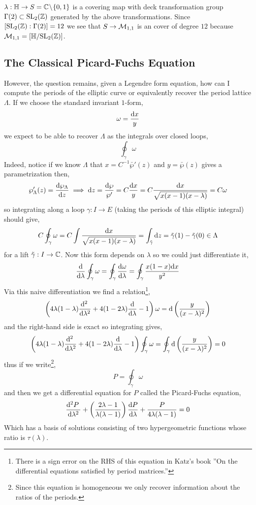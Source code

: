 \documentclass[12pt]{article}
\begin{document}
\begin{rmk}
$\lambda : \mathbb{H} \to S = \mathbb{C} \! \setminus \! \{ 0, 1 \}$ is a covering map with deck transformation group $\Gamma(2) \subset \mathrm{SL}_2(\mathbb{Z})$ generated by the above transformations. Since $[ \mathrm{SL}_2(\mathbb{Z}) : \Gamma(2)] = 12$ we see that $S \to \mathcal{M}_{1,1}$ is an \etale cover of degree $12$ because $\mathcal{M}_{1,1} = [\mathbb{H} / \mathrm{SL}_2(\mathbb{Z})]$.  
\end{rmk}


\subsection{The Classical Picard-Fuchs Equation}

However, the question remains, given a Legendre form equation, how can I compute the periods of the elliptic curve or equivalently recover the period lattice $\Lambda$. If we choose the standard invariant $1$-form,
\[ \omega = \frac{\mathrm{d}{x}}{y} \]
we expect to be able to recover $\Lambda$ as the integrals over closed loops,
\[ \oint_\gamma \omega \]
Indeed, notice if we know $\Lambda$ that $x = C^{-1} \bar{\wp}'(z)$ and $y = \bar{\wp}(z)$ gives a parametrization then,
\[ \wp'_{\Lambda}(z) = \frac{\mathrm{d}{\wp_\Lambda}}{\mathrm{d}{z}} \implies \mathrm{d}{z} = \frac{\mathrm{d}{\wp}}{\wp'} = C \frac{\mathrm{d}{x}}{y} = C \frac{\mathrm{d}{x}}{\sqrt{x(x-1)(x-\lambda)}} = C \omega \]
so integrating along a loop $\gamma : I \to E$ (taking the periods of this elliptic integral) should give,
\[ C \oint_\gamma \omega = C \int \frac{\mathrm{d}{x}}{\sqrt{x(x-1)(x-\lambda)}} = \int_{\tilde{\gamma}} \mathrm{d}{z} = \tilde{\gamma}(1) - \tilde{\gamma}(0) \in \Lambda \]
for a lift $\tilde{\gamma} : I \to \mathbb{C}$. Now this form depends on $\lambda$ so we could just differentiate it,
\[ \frac{\mathrm{d}{}}{\mathrm{d}{\lambda}} \oint_\gamma \omega = \oint_\gamma \frac{\mathrm{d}{\omega}}{\mathrm{d}{\lambda}} = \oint_{\gamma} \frac{x(1-x) \mathrm{d}{x}}{y^2} \]
Via this naive differentiation we find a relation\footnote{There is a sign error on the RHS of this equation in Katz's book ''On the differential equations satisfied by period matrices.''},
\[ \left( 4 \lambda(1 - \lambda) \frac{\mathrm{d}^{2}  \:}{\mathrm{d}{\lambda}^{2}} + 4 (1 - 2 \lambda) \frac{\mathrm{d}{}}{\mathrm{d}{\lambda}} - 1 \right) \omega = \mathrm{d} \left( \frac{y}{(x - \lambda)^2} \right) \]
and the right-hand side is exact so integrating gives,
\[ \left( 4 \lambda(1 - \lambda) \frac{\mathrm{d}^{2}  \:}{\mathrm{d}{\lambda}^{2}} + 4 (1 - 2 \lambda) \frac{\mathrm{d}{}}{\mathrm{d}{\lambda}} - 1 \right) \oint_\gamma  \omega = \oint_\gamma \mathrm{d} \left( \frac{y}{(x - \lambda)^2} \right) = 0 \] 
thus if we write\footnote{Since this equation is homogeneous we only recover information about the ratios of the periods.},
\[ P = \oint_\gamma \omega \]
and then we get a differential equation for $P$ called the Picard-Fuchs equation,
\[ \frac{\mathrm{d}^{2} P \:}{\mathrm{d}{\lambda}^{2}} + \left( \frac{2 \lambda - 1}{\lambda (\lambda - 1)} \right) \frac{\mathrm{d}{P}}{\mathrm{d}{\lambda}} + \frac{P}{4 \lambda(\lambda - 1)} = 0 \] 
Which has a basis of solutions consisting of two hypergeometric functions whose ratio is $\tau(\lambda)$. 
\end{document}
